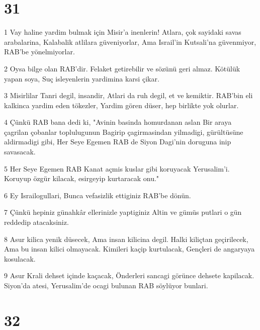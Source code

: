 \chapter{31}

\par 1 Vay haline yardim bulmak için Misir'a inenlerin! Atlara, çok sayidaki savas arabalarina, Kalabalik atlilara güveniyorlar, Ama Israil'in Kutsali'na güvenmiyor, RAB'be yönelmiyorlar.
\par 2 Oysa bilge olan RAB'dir. Felaket getirebilir ve sözünü geri almaz. Kötülük yapan soya, Suç isleyenlerin yardimina karsi çikar.
\par 3 Misirlilar Tanri degil, insandir, Atlari da ruh degil, et ve kemiktir. RAB'bin eli kalkinca yardim eden tökezler, Yardim gören düser, hep birlikte yok olurlar.
\par 4 Çünkü RAB bana dedi ki, "Avinin basinda homurdanan aslan Bir araya çagrilan çobanlar toplulugunun Bagirip çagirmasindan yilmadigi, gürültüsüne aldirmadigi gibi, Her Seye Egemen RAB de Siyon Dagi'nin doruguna inip savasacak.
\par 5 Her Seye Egemen RAB Kanat açmis kuslar gibi koruyacak Yerusalim'i. Koruyup özgür kilacak, esirgeyip kurtaracak onu."
\par 6 Ey Israilogullari, Bunca vefasizlik ettiginiz RAB'be dönün.
\par 7 Çünkü hepiniz günahkâr ellerinizle yaptiginiz Altin ve gümüs putlari o gün reddedip atacaksiniz.
\par 8 Asur kilica yenik düsecek, Ama insan kilicina degil. Halki kiliçtan geçirilecek, Ama bu insan kilici olmayacak. Kimileri kaçip kurtulacak, Gençleri de angaryaya kosulacak.
\par 9 Asur Krali dehset içinde kaçacak, Önderleri sancagi görünce dehsete kapilacak. Siyon'da atesi, Yerusalim'de ocagi bulunan RAB söylüyor bunlari.

\chapter{32}


